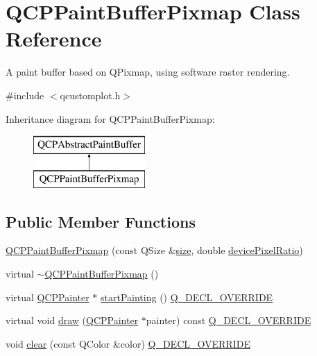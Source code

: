 \hypertarget{class_q_c_p_paint_buffer_pixmap}{}\section{Q\+C\+P\+Paint\+Buffer\+Pixmap Class Reference}
\label{class_q_c_p_paint_buffer_pixmap}


A paint buffer based on Q\+Pixmap, using software raster rendering.  




{\ttfamily \#include $<$qcustomplot.\+h$>$}

Inheritance diagram for Q\+C\+P\+Paint\+Buffer\+Pixmap\+:\begin{figure}[H]
\begin{center}
\leavevmode
\includegraphics[height=2.000000cm]{d1/df3/class_q_c_p_paint_buffer_pixmap}
\end{center}
\end{figure}
\subsection*{Public Member Functions}
\begin{DoxyCompactItemize}
\item 
\mbox{\hyperlink{class_q_c_p_paint_buffer_pixmap_aef0224e03b9285509391fcd61a8e6844}{Q\+C\+P\+Paint\+Buffer\+Pixmap}} (const Q\+Size \&\mbox{\hyperlink{class_q_c_p_abstract_paint_buffer_a3ea8284e547985c5d263f26a6adfa11f}{size}}, double \mbox{\hyperlink{class_q_c_p_abstract_paint_buffer_aac1b981f8c1744036610ff1a6b9461f9}{device\+Pixel\+Ratio}})
\item 
virtual \mbox{\hyperlink{class_q_c_p_paint_buffer_pixmap_a52b00bff4a36085b197bd374d5d24450}{$\sim$\+Q\+C\+P\+Paint\+Buffer\+Pixmap}} ()
\item 
virtual \mbox{\hyperlink{class_q_c_p_painter}{Q\+C\+P\+Painter}} $\ast$ \mbox{\hyperlink{class_q_c_p_paint_buffer_pixmap_a357964ef7d28cfa530338be4e5c93234}{start\+Painting}} () \mbox{\hyperlink{qcustomplot_8h_a42cc5eaeb25b85f8b52d2a4b94c56f55}{Q\+\_\+\+D\+E\+C\+L\+\_\+\+O\+V\+E\+R\+R\+I\+DE}}
\item 
virtual void \mbox{\hyperlink{class_q_c_p_paint_buffer_pixmap_af7bfc685e56a0a9329e57cd9a265eb74}{draw}} (\mbox{\hyperlink{class_q_c_p_painter}{Q\+C\+P\+Painter}} $\ast$painter) const \mbox{\hyperlink{qcustomplot_8h_a42cc5eaeb25b85f8b52d2a4b94c56f55}{Q\+\_\+\+D\+E\+C\+L\+\_\+\+O\+V\+E\+R\+R\+I\+DE}}
\item 
void \mbox{\hyperlink{class_q_c_p_paint_buffer_pixmap_a14badbd010a3cde6b55817ccb7b65217}{clear}} (const Q\+Color \&color) \mbox{\hyperlink{qcustomplot_8h_a42cc5eaeb25b85f8b52d2a4b94c56f55}{Q\+\_\+\+D\+E\+C\+L\+\_\+\+O\+V\+E\+R\+R\+I\+DE}}
\end{DoxyCompactItemize}
